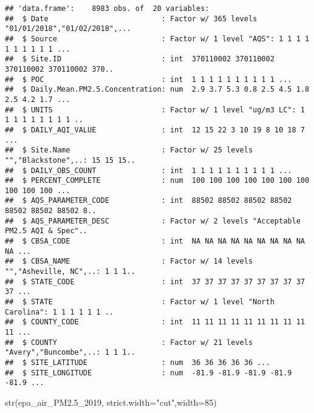 \documentclass[
]{article}
\newenvironment{Shaded}{\begin{snugshade}}{\end{snugshade}}
\newcommand{\AttributeTok}[1]{\textcolor[rgb]{0.77,0.63,0.00}{#1}}
\newcommand{\DecValTok}[1]{\textcolor[rgb]{0.00,0.00,0.81}{#1}}
\newcommand{\FloatTok}[1]{\textcolor[rgb]{0.00,0.00,0.81}{#1}}
\newcommand{\FunctionTok}[1]{\textcolor[rgb]{0.00,0.00,0.00}{#1}}
\newcommand{\NormalTok}[1]{#1}
\newcommand{\StringTok}[1]{\textcolor[rgb]{0.31,0.60,0.02}{#1}}
\begin{document}
\begin{verbatim}
## 'data.frame':    8983 obs. of  20 variables:
##  $ Date                          : Factor w/ 365 levels "01/01/2018","01/02/2018",...
##  $ Source                        : Factor w/ 1 level "AQS": 1 1 1 1 1 1 1 1 1 1 ...
##  $ Site.ID                       : int  370110002 370110002 370110002 370110002 370..
##  $ POC                           : int  1 1 1 1 1 1 1 1 1 1 ...
##  $ Daily.Mean.PM2.5.Concentration: num  2.9 3.7 5.3 0.8 2.5 4.5 1.8 2.5 4.2 1.7 ...
##  $ UNITS                         : Factor w/ 1 level "ug/m3 LC": 1 1 1 1 1 1 1 1 1 ..
##  $ DAILY_AQI_VALUE               : int  12 15 22 3 10 19 8 10 18 7 ...
##  $ Site.Name                     : Factor w/ 25 levels "","Blackstone",..: 15 15 15..
##  $ DAILY_OBS_COUNT               : int  1 1 1 1 1 1 1 1 1 1 ...
##  $ PERCENT_COMPLETE              : num  100 100 100 100 100 100 100 100 100 100 ...
##  $ AQS_PARAMETER_CODE            : int  88502 88502 88502 88502 88502 88502 88502 8..
##  $ AQS_PARAMETER_DESC            : Factor w/ 2 levels "Acceptable PM2.5 AQI & Spec"..
##  $ CBSA_CODE                     : int  NA NA NA NA NA NA NA NA NA NA ...
##  $ CBSA_NAME                     : Factor w/ 14 levels "","Asheville, NC",..: 1 1 1..
##  $ STATE_CODE                    : int  37 37 37 37 37 37 37 37 37 37 ...
##  $ STATE                         : Factor w/ 1 level "North Carolina": 1 1 1 1 1 1 ..
##  $ COUNTY_CODE                   : int  11 11 11 11 11 11 11 11 11 11 ...
##  $ COUNTY                        : Factor w/ 21 levels "Avery","Buncombe",..: 1 1 1..
##  $ SITE_LATITUDE                 : num  36 36 36 36 36 ...
##  $ SITE_LONGITUDE                : num  -81.9 -81.9 -81.9 -81.9 -81.9 ...
\end{verbatim}

\begin{Shaded}
\begin{Highlighting}[]
\FunctionTok{str}\NormalTok{(epa\_air\_PM2}\FloatTok{.5}\NormalTok{\_2019, }\AttributeTok{strict.width=}\StringTok{"cut"}\NormalTok{,}\AttributeTok{width=}\DecValTok{85}\NormalTok{)}
\end{Highlighting}
\end{Shaded}
\end{document}
